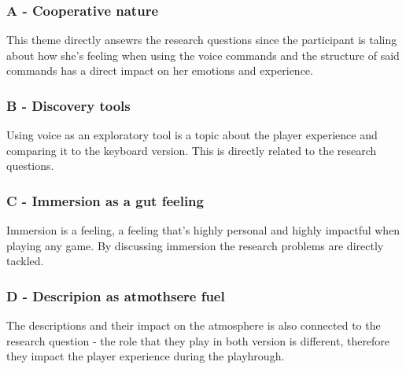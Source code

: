 \subsubsection{A - Cooperative nature}
This theme directly ansewrs the research questions since the participant is taling about how she's feeling when using the voice commands and the structure of said commands has a direct impact on her emotions and experience.

\subsubsection{B - Discovery tools}

Using voice as an exploratory tool is a topic about the player experience and comparing it to the keyboard version. This is directly related to the research questions.


\subsubsection{C - Immersion as a gut feeling}


Immersion is a feeling, a feeling that's highly personal and highly impactful when playing any game. By discussing immersion the research problems are directly tackled. 


\subsubsection{D - Descripion as atmothsere fuel}


The descriptions and their impact on the atmosphere is also connected to the research question - the role that they play in both version is different, therefore they impact the player experience during the playhrough.




